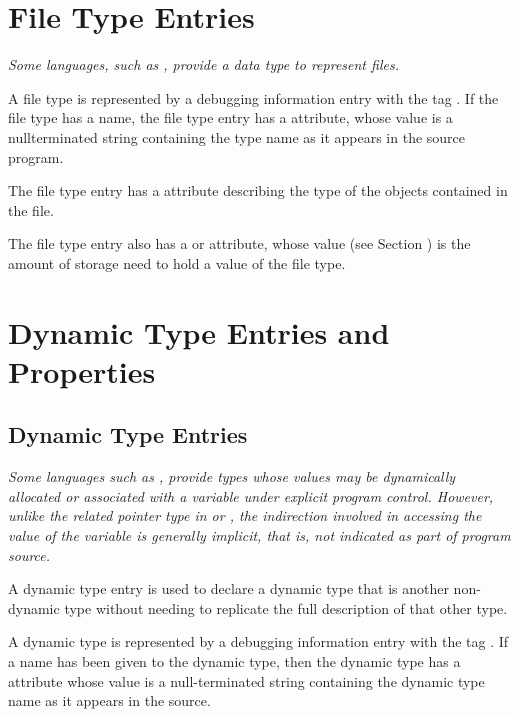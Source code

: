 \section{File Type Entries}
\label{chap:filetypeentries}

\textit{Some languages, such as , 
provide a data type to represent 
files.}

A file type is represented by a debugging information entry
with 
the tag
\DWTAGfiletypeTARG. 
If the file type has a name,
the file type entry has a \DWATname{} attribute,
whose value
is a null\dash terminated string containing the type name as it
appears in the source program.

The file type entry has 
a \DWATtype{} attribute describing
the type of the objects contained in the file.

The file type entry also has a 
\DWATbytesize{} or
\DWATbitsize{} attribute, whose value 
(see Section )
is the amount of storage need to hold a value of the file type.

\section{Dynamic Type Entries and Properties}

\subsection{Dynamic Type Entries}
\textit{Some languages such as 
, provide types whose values
may be dynamically allocated or associated with a variable
under explicit program control. However, unlike the related
pointer type in  or 
, the indirection involved in accessing
the value of the variable is generally implicit, that is, not
indicated as part of program source.}

A dynamic type entry is used to declare a dynamic type that is 
 another non-dynamic type without needing to
replicate the full description of that other type.

A dynamic type is represented by a debugging information entry
with the tag \DWTAGdynamictypeTARG. If a name has been given to the
dynamic type, then the dynamic type has a \DWATname{} attribute 
whose value is a null-terminated string containing the dynamic
type name as it appears in the source.
	
